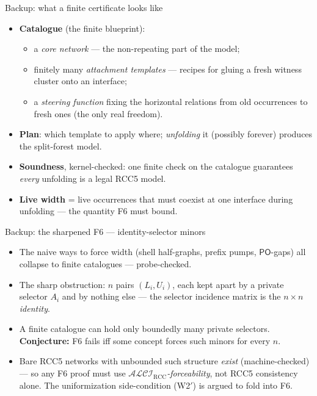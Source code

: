 \documentclass[aspectratio=169,11pt]{beamer}
\newcommand{\ALCIRCC}[1]{\mathcal{ALCI}_{\mathrm{RCC#1}}}
\newcommand{\PO}{\mathsf{PO}}
\begin{document}
\begin{frame}{Backup: what a finite certificate looks like}
\begin{itemize}
  \item \textbf{Catalogue} (the finite blueprint):
    \begin{itemize}
      \item a \emph{core network} --- the non-repeating part of the model;
      \item finitely many \emph{attachment templates} --- recipes for gluing a
            fresh witness cluster onto an interface;
      \item a \emph{steering function} fixing the horizontal relations from
            old occurrences to fresh ones (the only real freedom).
    \end{itemize}
  \item \textbf{Plan}: which template to apply where; \emph{unfolding} it
        (possibly forever) produces the split-forest model.
  \item \textbf{Soundness}, kernel-checked: one finite check on the catalogue
        guarantees \emph{every} unfolding is a legal RCC5 model.
  \item \textbf{Live width} = live occurrences that must coexist at one
        interface during unfolding --- the quantity F6 must bound.
\end{itemize}
\end{frame}

\begin{frame}{Backup: the sharpened F6 --- identity-selector minors}
\begin{itemize}
  \item The naive ways to force width (shell half-graphs, prefix pumps,
        $\PO$-gaps) all \alert{collapse} to finite catalogues --- probe-checked.
  \item The sharp obstruction: $n$ pairs $(L_i, U_i)$, each kept apart by a
        \alert{private} selector $A_i$ and by nothing else --- the selector
        incidence matrix is the $n\times n$ \emph{identity}.
  \item A finite catalogue can hold only boundedly many private selectors.
        \textbf{Conjecture:} F6 fails iff some concept forces such minors for
        every $n$.
  \item Bare RCC5 networks with unbounded such structure \emph{exist}
        (machine-checked) --- so any F6 proof must use
        \emph{$\ALCIRCC{}$-forceability}, not RCC5 consistency alone.
        The uniformization side-condition (W2$'$) is argued to fold into F6.
\end{itemize}
\end{frame}
\end{document}
